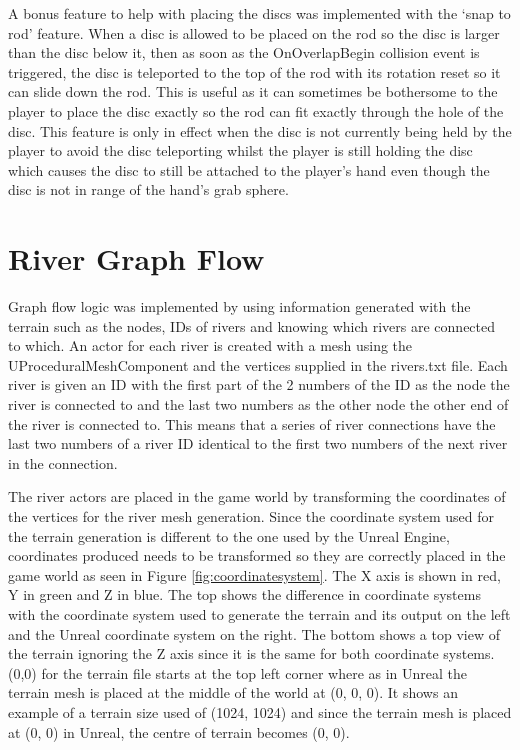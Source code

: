 \newline
\par
A bonus feature to help with placing the discs was implemented with the `snap to rod' feature. When a disc is allowed to be placed on the rod so the disc is larger than the disc below it, then as soon as the OnOverlapBegin collision event is triggered, the disc is teleported to the top of the rod with its rotation reset so it can slide down the rod. This is useful as it can sometimes be bothersome to the player to place the disc exactly so the rod can fit exactly through the hole of the disc. This feature is only in effect when the disc is not currently being held by the player to avoid the disc teleporting whilst the player is still holding the disc which causes the disc to still be attached to the player's hand even though the disc is not in range of the hand's grab sphere.

\section{River Graph Flow}
Graph flow logic was implemented by using information generated with the terrain such as the nodes, IDs of rivers and knowing which rivers are connected to which. An actor for each river is created with a mesh using the UProceduralMeshComponent and the vertices supplied in the rivers.txt file. Each river is given an ID with the first part of the 2 numbers of the ID as the node the river is connected to and the last two numbers as the other node the other end of the river is connected to. This means that a series of river connections have the last two numbers of a river ID identical to the first two numbers of the next river in the connection.
\newline
\par
The river actors are placed in the game world by transforming the coordinates of the vertices for the river mesh generation. Since the coordinate system used for the terrain generation is different to the one used by the Unreal Engine, coordinates produced needs to be transformed so they are correctly placed in the game world as seen in Figure \ref{fig:coordinatesystem}. The X axis is shown in red, Y in green and Z in blue. The top shows the difference in coordinate systems with the coordinate system used to generate the terrain and its output on the left and the Unreal coordinate system on the right. The bottom shows a top view of the terrain ignoring the Z axis since it is the same for both coordinate systems. (0,0) for the terrain file starts at the top left corner where as in Unreal the terrain mesh is placed at the middle of the world at (0, 0, 0). It shows an example of a terrain size used of (1024, 1024) and since the terrain mesh is placed at (0, 0) in Unreal, the centre of terrain becomes (0, 0).
\newline
\par

